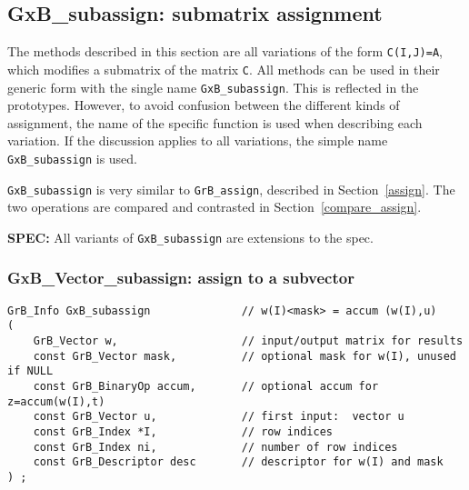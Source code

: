 \documentclass[12pt]{article}
\begin{document}
\newpage
\subsection{{\sf GxB\_subassign:} submatrix assignment} %
\label{subassign}

The methods described in this section are all variations of the form
\verb'C(I,J)=A', which modifies a submatrix of the matrix \verb'C'.  All
methods can be used in their generic form with the single name
\verb'GxB_subassign'.  This is reflected in the prototypes.  However, to avoid
confusion between the different kinds of assignment, the name of the specific
function is used when describing each variation.  If the discussion applies to
all variations, the simple name \verb'GxB_subassign' is used.

\verb'GxB_subassign' is very similar to \verb'GrB_assign', described in
Section~\ref{assign}.  The two operations are compared and contrasted in
Section~\ref{compare_assign}.

\begin{spec}
{\bf SPEC:} All variants of \verb'GxB_subassign' are extensions to the spec.
\end{spec}

\subsubsection{{\sf GxB\_Vector\_subassign:} assign to a subvector }
\label{subassign_vector}

\begin{mdframed}[userdefinedwidth=6in]
{\footnotesize
\begin{verbatim}
GrB_Info GxB_subassign              // w(I)<mask> = accum (w(I),u)
(
    GrB_Vector w,                   // input/output matrix for results
    const GrB_Vector mask,          // optional mask for w(I), unused if NULL
    const GrB_BinaryOp accum,       // optional accum for z=accum(w(I),t)
    const GrB_Vector u,             // first input:  vector u
    const GrB_Index *I,             // row indices
    const GrB_Index ni,             // number of row indices
    const GrB_Descriptor desc       // descriptor for w(I) and mask
) ;
\end{verbatim} } \end{mdframed}
\end{document}

